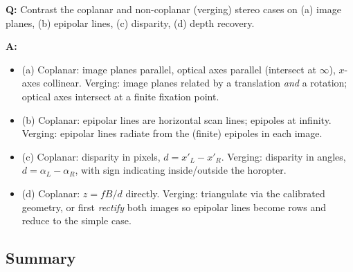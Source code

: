 \begin{exbox}
\textbf{Q:} Contrast the coplanar and non-coplanar (verging) stereo cases on (a) image planes, (b) epipolar lines, (c) disparity, (d) depth recovery.

\textbf{A:}
\begin{itemize}
  \item (a) Coplanar: image planes parallel, optical axes parallel (intersect at $\infty$), $x$-axes collinear. Verging: image planes related by a translation \emph{and} a rotation; optical axes intersect at a finite fixation point.
  \item (b) Coplanar: epipolar lines are horizontal scan lines; epipoles at infinity. Verging: epipolar lines radiate from the (finite) epipoles in each image.
  \item (c) Coplanar: disparity in pixels, $d = x'_L - x'_R$. Verging: disparity in angles, $d = \alpha_L - \alpha_R$, with sign indicating inside/outside the horopter.
  \item (d) Coplanar: $z = fB/d$ directly. Verging: triangulate via the calibrated geometry, or first \emph{rectify} both images so epipolar lines become rows and reduce to the simple case.
\end{itemize}
\end{exbox}

\bigseparator

\subsection{Summary}

